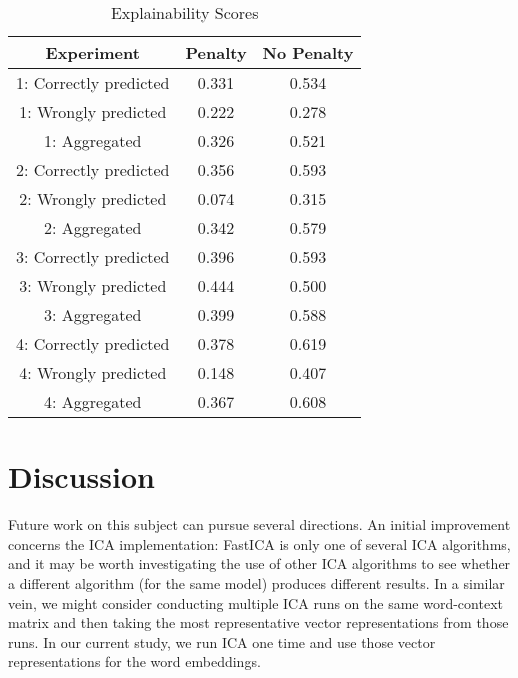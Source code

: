 \documentclass{article}
\begin{document}
\begin{table}
 \caption{Explainability Scores}
  \centering
  \begin{tabular}{|c|c|c|}
    \hline
    \rowcolor{lightgray} \textbf{Experiment} & \textbf{Penalty} & \textbf{No Penalty} \\
    \hline
    1: Correctly predicted & 0.331 & 0.534 \\
    \hline
    1: Wrongly predicted & 0.222 & 0.278 \\
    \hline
    1: Aggregated & 0.326 & 0.521 \\
    \hline
    2: Correctly predicted & 0.356 & 0.593 \\
    \hline
    2: Wrongly predicted & 0.074 & 0.315 \\
    \hline
    2: Aggregated & 0.342 & 0.579 \\
    \hline
    3: Correctly predicted & \cellcolor{green} 0.396 & 0.593 \\
    \hline
    3: Wrongly predicted & \cellcolor{green} 0.444 & \cellcolor{green} 0.500 \\
    \hline
    3: Aggregated & \cellcolor{green} 0.399 & 0.588 \\
    \hline
    4: Correctly predicted & 0.378 & \cellcolor{green} 0.619 \\
    \hline
    4: Wrongly predicted & 0.148 & 0.407 \\
    \hline
    4: Aggregated & 0.367 & \cellcolor{green} 0.608 \\
    \hline
  \end{tabular}
  \label{tab:expl}
\end{table}

\hypertarget{discussion}{%
\section{Discussion}\label{discussion}}

\label{sec:discuss}

Future work on this subject can pursue several directions. An initial
improvement concerns the ICA implementation: FastICA is only one of
several ICA algorithms, and it may be worth investigating the use of
other ICA algorithms to see whether a different algorithm (for the same
model) produces different results. In a similar vein, we might consider
conducting multiple ICA runs on the same word-context matrix and then
taking the most representative vector representations from those runs.
In our current study, we run ICA one time and use those vector
representations for the word embeddings.
\end{document}

